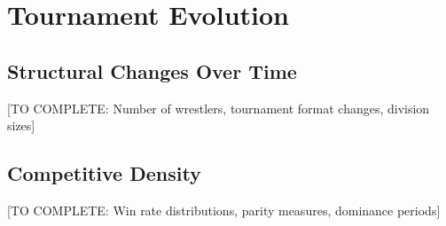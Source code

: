 \section{Tournament Evolution}

\subsection{Structural Changes Over Time}

[TO COMPLETE: Number of wrestlers, tournament format changes, division sizes]

\subsection{Competitive Density}

[TO COMPLETE: Win rate distributions, parity measures, dominance periods]